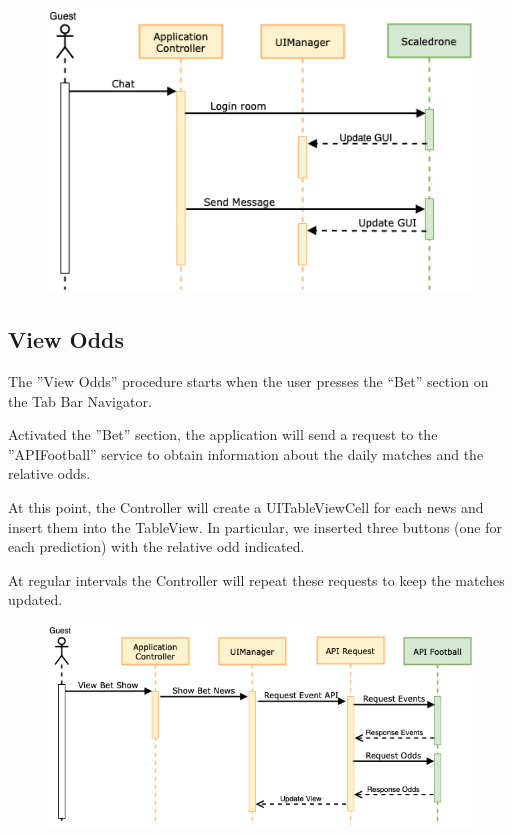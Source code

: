 \documentclass[numbers=noenddot, 12pt, a4paper, oneside]{scrbook}
\begin{document}
\begin{figure}[H]
	\centering
	\includegraphics[width=1\textwidth]{images/Sequence/Chat}
\end{figure}
\newpage

\subsection*{View Odds}
The ”View Odds” procedure starts when the user presses the “Bet” section on the Tab Bar Navigator.

Activated the ”Bet” section, the application will send a request to the ”APIFootball” service to obtain information about the daily matches and the relative odds.

At this point, the Controller will create a UITableViewCell for each news and insert them into the TableView. In particular, we inserted three buttons (one for each prediction) with the relative odd indicated.

At regular intervals the Controller will repeat these requests to keep the matches updated.
\begin{figure}[H]
	\centering
	\includegraphics[width=1\textwidth]{images/Sequence/SequenceOdds}
\end{figure}
\end{document}
